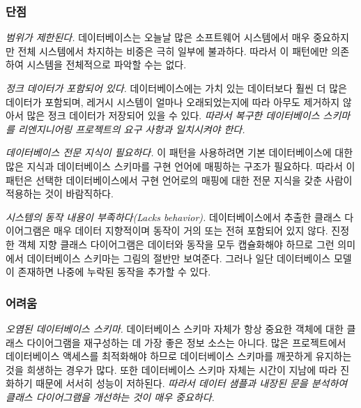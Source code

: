 \documentclass[a4paper,10pt,twoside]{book}
\begin{document}
\subsubsection*{단점}

\begin{bulletlist}
\item \emph{범위가 제한된다.}
데이터베이스는 오늘날 많은 소프트웨어 시스템에서 매우 중요하지만 전체 시스템에서 차지하는 비중은 극히 일부에 불과하다. 따라서 이 패턴에만 의존하여 시스템을 전체적으로 파악할 수는 없다.

\item \emph{정크 데이터가 포함되어 있다.}
데이터베이스에는 가치 있는 데이터보다 훨씬 더 많은 데이터가 포함되며, 레거시 시스템이 얼마나 오래되었는지에 따라 아무도 제거하지 않아서 많은 정크 데이터가 저장되어 있을 수 있다. \emph{따라서 복구한 데이터베이스 스키마를 리엔지니어링 프로젝트의 요구 사항과 일치시켜야 한다.}

\item \emph{데이터베이스 전문 지식이 필요하다.}
이 패턴을 사용하려면 기본 데이터베이스에 대한 많은 지식과 데이터베이스 스키마를 구현 언어에 매핑하는 구조가 필요하다. 따라서 이 패턴은 선택한 데이터베이스에서 구현 언어로의 매핑에 대한 전문 지식을 갖춘 사람이 적용하는 것이 바람직하다.

\item \emph{시스템의 동작 내용이 부족하다(Lacks behavior).}
데이터베이스에서 추출한 클래스 다이어그램은 매우 데이터 지향적이며 동작이 거의 또는 전혀 포함되어 있지 않다. 진정한 객체 지향 클래스 다이어그램은 데이터와 동작을 모두 캡슐화해야 하므로 그런 의미에서 데이터베이스 스키마는 그림의 절반만 보여준다. 그러나 일단 데이터베이스 모델이 존재하면 나중에 누락된 동작을 추가할 수 있다.
\end{bulletlist}

\subsubsection*{어려움}

\begin{bulletlist}
\item \emph{오염된 데이터베이스 스키마.}
데이터베이스 스키마 자체가 항상 중요한 객체에 대한 클래스 다이어그램을 재구성하는 데 가장 좋은 정보 소스는 아니다. 많은 프로젝트에서 데이터베이스 액세스를 최적화해야 하므로 데이터베이스 스키마를 깨끗하게 유지하는 것을 희생하는 경우가 많다. 또한 데이터베이스 스키마 자체는 시간이 지남에 따라 진화하기 때문에 서서히 성능이 저하된다. \emph{따라서 데이터 샘플과 내장된  문을 분석하여 클래스 다이어그램을 개선하는 것이 매우 중요하다.}
\end{bulletlist}
\end{document}
